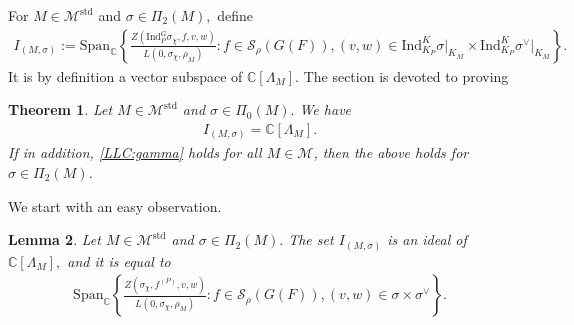\documentclass[10pt]{amsart}
\newtheorem{theorem}{Theorem}[section]
\newtheorem{lemma}[theorem]{Lemma}
\theoremstyle{definition}
\numberwithin{equation}{section}
\numberwithin{equation}{subsection}
\newcommand{\Ind}{\mathrm{Ind}}
\newcommand{\CC}{\mathbb{C}}
\begin{document}
For $M\in \mathcal{M}^{\mathrm{std}}$ and $\sigma\in \Pi_2(M),$ define
    \begin{align*}
         I_{(M,\sigma)}:=\mathrm{Span}_\CC\left\{\frac{Z(\mathrm{Ind}_P^G \sigma_\chi,f,v,w)}{L(0,\sigma_\chi,\rho_M)}: f\in \mathcal{S}_\rho(G(F)),(v,w)\in \Ind_{K_P}^K\sigma\vert_{K_M}\times \Ind_{K_P}^K\sigma^\vee\vert_{K_M}\right\}.
    \end{align*}
It is by definition a vector subspace of $\CC[\Lambda_M].$  The section is devoted to proving 
\begin{theorem}\label{multigcd}
    Let $M\in \mathcal{M}^{\mathrm{std}}$ and $\sigma\in \Pi_0(M).$ We have
    \begin{align*}
        I_{(M,\sigma)}=\CC[\Lambda_M].
    \end{align*}
    If in addition, \eqref{LLC:gamma} holds for all $M\in \mathcal{M}$, then the above holds for $\sigma\in \Pi_2(M)$. 
\end{theorem}

We start with an easy observation.
\begin{lemma}\label{lem:ideal}
      Let $M\in \mathcal{M}^{\mathrm{std}}$ and $\sigma\in \Pi_2(M).$ The set $I_{(M,\sigma)}$ is an ideal of $\CC[\Lambda_M],$ and it is equal to
    \begin{align}\label{eq:ideal:alternative}
        \mathrm{Span}_\CC\left\{\frac{Z(\sigma_\chi,f^{(P)},v,w) }{L(0,\sigma_\chi,\rho_M)}: f\in \mathcal{S}_\rho(G(F)),(v,w)\in \sigma \times \sigma^\vee\right\}.
    \end{align}
\end{lemma}
\end{document}
